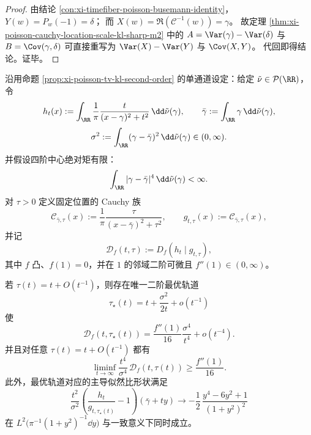 \begin{proof}
由结论 \ref{con:xi-timefiber-poisson-busemann-identity}，
\(
Y(w)=P_w(-1)=\delta
\)；
而
\(
X(w)=\Re(\mathcal C^{-1}(w))=\gamma
\)。
故定理 \ref{thm:xi-poisson-cauchy-location-scale-kl-sharp-m2} 中的
\(
A=\Var(\gamma)-\Var(\delta)
\) 与
\(
B=\Cov(\gamma,\delta)
\)
可直接重写为
\(
\Var(X)-\Var(Y)
\) 与
\(
\Cov(X,Y)
\)。
代回即得结论。证毕。
\end{proof}

\begin{theorem}\label{thm:xi-cauchy-poisson-fixed-location-scale-optimal-renormalization}
沿用命题 \ref{prop:xi-poisson-tv-kl-second-order} 的单通道设定：给定 \(\tilde\nu\in\mathcal P(\RR)\)，令
\[
h_t(x):=\int_{\RR}\frac1\pi\frac{t}{(x-\gamma)^2+t^2}\,\dd\tilde\nu(\gamma),\qquad
\bar\gamma:=\int_{\RR}\gamma\,\dd\tilde\nu(\gamma),
\]
\[
\sigma^2:=\int_{\RR}(\gamma-\bar\gamma)^2\,\dd\tilde\nu(\gamma)\in(0,\infty).
\]
并假设四阶中心绝对矩有限：
\[
\int_{\RR}|\gamma-\bar\gamma|^4\,\dd\tilde\nu(\gamma)<\infty.
\]
对 \(\tau>0\) 定义固定位置的 Cauchy 族
\[
\mathcal C_{\bar\gamma,\tau}(x):=\frac1\pi\frac{\tau}{(x-\bar\gamma)^2+\tau^2},
\qquad
g_{t,\tau}(x):=\mathcal C_{\bar\gamma,\tau}(x),
\]
并记
\[
\mathcal D_f(t,\tau):=D_f(h_t\mid g_{t,\tau}),
\]
其中 \(f\) 凸、\(f(1)=0\)，并在 \(1\) 的邻域二阶可微且 \(f''(1)\in(0,\infty)\)。

若 \(\tau(t)=t+O(t^{-1})\)，则存在唯一二阶最优轨道
\[
\tau_\star(t)=t+\frac{\sigma^2}{2t}+o(t^{-1})
\]
使
\[
\mathcal D_f(t,\tau_\star(t))
=\frac{f''(1)}{16}\frac{\sigma^4}{t^4}+o(t^{-4}).
\]
并且对任意 \(\tau(t)=t+O(t^{-1})\) 都有
\[
\liminf_{t\to\infty}\frac{t^4}{\sigma^4}\,\mathcal D_f(t,\tau(t))
\ge \frac{f''(1)}{16}.
\]
此外，最优轨道对应的主导似然比形状满足
\[
\frac{t^2}{\sigma^2}\left(\frac{h_t}{g_{t,\tau_\star(t)}}-1\right)(\bar\gamma+ty)
\longrightarrow
-\frac12\,\frac{y^4-6y^2+1}{(1+y^2)^2}
\]
在 \(L^2\!\bigl(\pi^{-1}(1+y^2)^{-1}\dd y\bigr)\) 与一致意义下同时成立。
\end{theorem}
